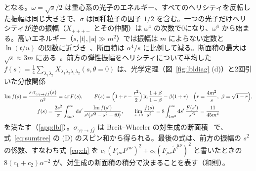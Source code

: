 \documentclass[a4paper,10pt]{ltjsarticle}
\newcommand{\dd}{\mathrm{d}}
\begin{document}
となる。$\omega=\sqrt s/2$ は重心系の光子のエネルギー、すべてのヘリシティを反転した振幅は同じ大きさで、$\sigma$ は同種粒子の因子 $1/2$ を含む。一つの光子だけヘリシティが逆の振幅（$X_{+++-}$ とその仲間）は $\omega^4$ の次数で0になり、$\omega^6$ から始まる。高いエネルギー（$s,|t|,|u|\gg m^2$）では振幅は $m$ によらない定数と $\ln(t/u)$ の関数に近づき~\cite{bern01}、断面積は $\alpha^4/s$ に比例して減る。断面積の最大は $\sqrt s\approx3m$ にある~\cite{kn51}。前方の弾性振幅をヘリシティについて平均した $f(s)=\frac14\sum_{\lambda_1\lambda_2}X_{\lambda_1\lambda_2\lambda_1\lambda_2}(s,\theta=0)$ は、光学定理（図~\ref{fig:lbldiag} (d)）と2回引いた分散関係
\begin{equation}
\begin{gathered}
\mathrm{Im}\,f(s)=\frac{s\,\sigma_{\gamma\gamma\to f\bar f}(s)}{\alpha^2}=4\pi F(s),\qquad
F(s)=\Bigl(1+r-\frac{r^2}{2}\Bigr)\ln\frac{1+\beta}{1-\beta}-\beta(1+r)\quad\Bigl(r=\frac{4m^2}{s},\ \beta=\sqrt{1-r}\Bigr),\\
f(s)=\frac{2s^2}{\pi}\int_{4m^2}^\infty\dd s'\,\frac{\mathrm{Im}\,f(s')}{s'(s'^2-s^2-i0)},\qquad
\lim_{s\to0}\frac{f(s)}{s^2}=8\int_{4m^2}^\infty\dd s'\,\frac{F(s')}{s'^3}=\frac{11}{45m^4}
\end{gathered}
\label{eq:lblopt}
\end{equation}
を満たす（\ref{app:lbl}）。$\sigma_{\gamma\gamma\to f\bar f}$ は Breit--Wheeler の対生成の断面積~\cite{bw34} で、式~\eqref{eq:sumtree} の (D) のスピン和から得られる。最後の式は、前方の振幅の $s^2$ の係数、すなわち式~\eqref{eq:eh} を $c_1(F_{\mu\nu}F^{\mu\nu})^2+c_2(F_{\mu\nu}\tilde F^{\mu\nu})^2$ と書いたときの $8(c_1+c_2)\alpha^{-2}$ が、対生成の断面積の積分で決まることを表す（和則）。
\end{document}
